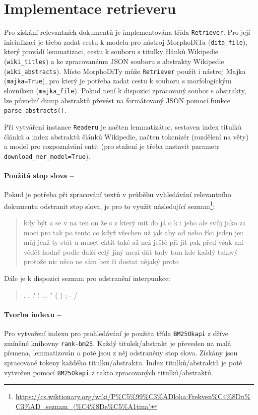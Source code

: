 \section{Implementace retrieveru}
\label{retriever_imp}
Pro získání relevantních dokumentů je implementována třída \texttt{Retriever}. Pro její inicializaci je třeba zadat cestu k modelu pro nástroj MorphoDiTa (\texttt{dita\_file}), který provádí lemmatizaci, cestu k souboru s titulky článků Wikipedie (\texttt{wiki\_titles}) a ke zpracovanému JSON souboru s abstrakty Wikipedie (\texttt{wiki\_abstracts}). Místo MorphoDiTy může \texttt{Retriever} použít i nástroj Majka (\texttt{majka=True}), pro který je potřeba zadat cestu k souboru s morfologickým slovníkem (\texttt{majka\_file}). Pokud není k dispozici zpracovaný soubor s abstrakty, lze původní dump abstraktů převést na formátovaný JSON pomocí funkce \texttt{parse\_abstracts()}.\par
Při vytváření instance \texttt{Readeru} je načten lemmatizátor, sestaven index titulků článků a index abstraktů článků Wikipedie, načten tokenizér (rozdělení na věty) a model pro rozpoznávání entit (pro stažení je třeba nastavit parametr \texttt{download\_ner\_model=True}).\par

\paragraph{Použitá stop slova --}
Pokud je potřeba při zpracování textů v průběhu vyhledávání relevantního dokumentu odstranit stop slova, je pro to využit následující seznam\footnote{\scriptsize \url{https://cs.wiktionary.org/wiki/P\%C5\%99\%C3\%ADloha:Frekven\%C4\%8Dn\%C3\%AD\_seznam\_(\%C4\%8De\%C5\%A1tina)}}:
\begin{quote}
    {\footnotesize kdy být a se v na ten on že s z který mít do já o k i jeho ale svůj jako za moci pro tak po tento co když všechen už jak aby od nebo říci jeden jen můj jenž ty stát u muset chtít také až než ještě při jít pak před však ani vědět hodně podle další celý jiný mezi dát tady tam kde každý takový protože nic něco ne sám bez či dostat nějaký proto}
\end{quote}
Dále je k dispozici seznam pro odstranění interpunkce:
\begin{quote}
    {\footnotesize . , ? ! ... " ( ) ; - /}
\end{quote}

\paragraph{Tvorba indexu --}
Pro vytvoření indexu pro prohledávání je použita třída \texttt{BM25Okapi} z dříve zmíněné knihovny \texttt{rank-bm25}. Každý titulek/abstrakt je převeden na malá písmena, lemmatizován a poté jsou z něj odstraněny stop slova. Získány jsou zpracované tokeny každého titulku/abstraktu. Index titulků/abstraktů je poté vytvořen pomocí \texttt{BM25Okapi} z takto zpracovaných titulků/abstraktů.

